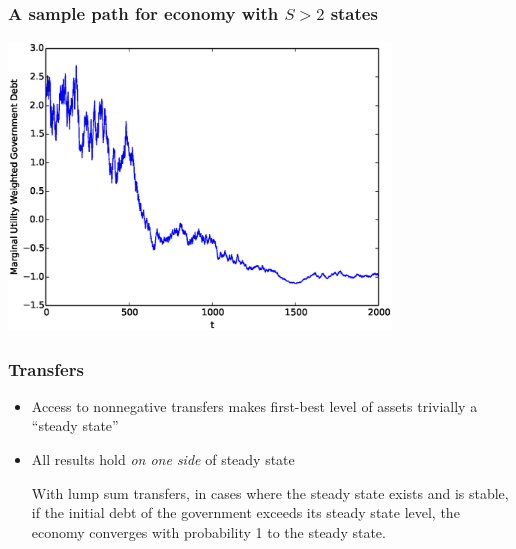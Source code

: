 \documentclass{beamer}
\begin{document}
\subsection{}

\begin{frame}
	\frametitle{A sample path  for economy with $S>2$ states}
	\begin{center}
	\includegraphics[width=4in]{Images/5stateiid.eps}
	\end{center}
\end{frame}



 \begin{frame}
  \frametitle{Transfers}
	\begin{itemize}	
	\item Access to nonnegative transfers makes first-best level of assets trivially a ``steady state''  	
\item  All results hold \textit{on one side} of steady state
\begin{theorem}

With lump sum transfers,  in cases where the steady state exists and is stable,  if the initial debt of the government exceeds its steady state level,  the economy  converges with probability 1 to the steady state.

\end{theorem}
		
	\end{itemize}
 \end{frame}
\end{document}
